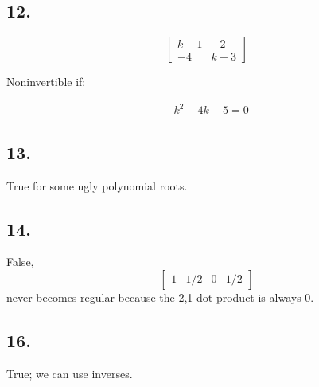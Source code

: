 \documentclass[]{article}
\newenvironment{Shaded}{\begin{snugshade}}{\end{snugshade}}
\newcommand{\DataTypeTok}[1]{\textcolor[rgb]{0.00,0.34,0.68}{#1}}
\newcommand{\DecValTok}[1]{\textcolor[rgb]{0.69,0.50,0.00}{#1}}
\newcommand{\KeywordTok}[1]{\textcolor[rgb]{0.12,0.11,0.11}{\textbf{#1}}}
\newcommand{\NormalTok}[1]{\textcolor[rgb]{0.12,0.11,0.11}{#1}}
\newcommand{\OperatorTok}[1]{\textcolor[rgb]{0.12,0.11,0.11}{#1}}
\newcommand{\OtherTok}[1]{\textcolor[rgb]{0.00,0.43,0.16}{#1}}
\newcommand{\StringTok}[1]{\textcolor[rgb]{0.75,0.01,0.01}{#1}}
\newcommand{\m}[1]{\begin{bmatrix}#1\end{bmatrix}}
\newcommand{\meq}[1]{\begin{split}#1\end{split}}
\begin{document}
\hypertarget{section-128}{%
\subsection{12.}\label{section-128}}

\[\m{k-1&-2\\
-4&k-3}\]

Noninvertible if:

\[\meq{&k^2-4k + 5 = 0}\]

\hypertarget{section-129}{%
\subsection{13.}\label{section-129}}

True for some ugly polynomial roots.

\hypertarget{section-130}{%
\subsection{14.}\label{section-130}}

False, \[\m{1&1/2&0&1/2}\] never becomes regular because the 2,1 dot
product is always 0.

\hypertarget{section-131}{%
\subsection{16.}\label{section-131}}

True; we can use inverses.

\begin{Shaded}
\end{Shaded}
\end{document}
